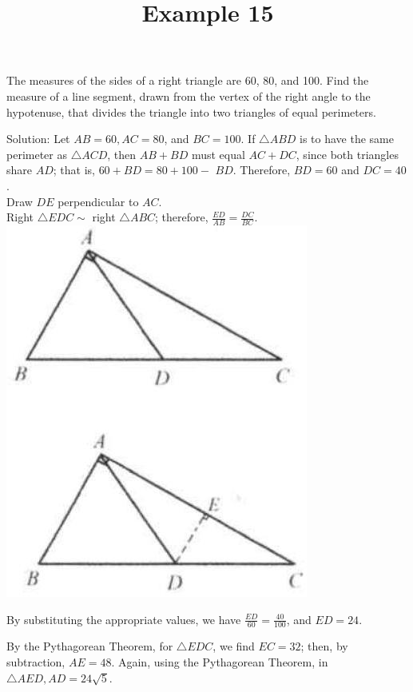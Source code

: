 \documentclass{article}
\title{Example 15}
\date{}
\begin{document}
\maketitle

The measures of the sides of a right triangle are 60, 80, and 100. Find the measure of a line segment, drawn from the vertex of the right angle to the hypotenuse, that divides the triangle into two triangles of equal perimeters.

Solution:
Let \(A B=60, A C=80\), and \(B C=100\). If \(\triangle A B D\) is to have the same perimeter as \(\triangle A C D\), then \(A B+B D\) must equal \(A C+D C\), since both triangles share \(A D\); that is, \(60+B D=80+100-\) \(B D\). Therefore, \(B D=60\) and \(D C=40\).\\
Draw \(D E\) perpendicular to \(A C\).\\
Right \(\triangle E D C \sim\) right \(\triangle A B C\); therefore, \(\frac{E D}{A B}=\frac{D C}{B C}\).\\
\centering
\includegraphics[width=\textwidth]{images/083(2).jpg}


By substituting the appropriate values, we have \(\frac{E D}{60}=\frac{40}{100}\), and \(E D=24\).

By the Pythagorean Theorem, for \(\triangle E D C\), we find \(E C=32\); then, by subtraction, \(A E=48\). Again, using the Pythagorean Theorem, in \(\triangle A E D, A D=24 \sqrt{5}\).
\end{document}
